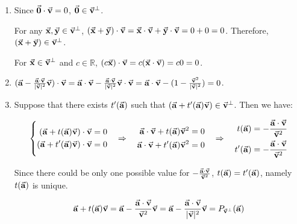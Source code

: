 \begin{exercise}{19}
\end{exercise}

\begin{exercise}{24}
  \def \Set {\Vect{v}^{\bot}}
  \begin{enumerate}
    \item Since $\vec{\mathbf{0}} \cdot \vec{\mathbf{v}} = 0$, $\Vect{0} \in \Set$.
    
          For any $\Vect{x}, \Vect{y} \in \Set$, $(\vec{\mathbf{x}} + \vec{\mathbf{y}}) \cdot \vec{\mathbf{v}} = \vec{\mathbf{x}} \cdot \vec{\mathbf{v}} + \vec{\mathbf{y}} \cdot \vec{\mathbf{v}} = 0 + 0 = 0$. Therefore, $(\Vect{x} + \Vect{y}) \in \Set$.
          
          For $\Vect{x} \in \Set$ and $c \in \mathbb{R}$, $(c\vec{\mathbf{x}}) \cdot \vec{\mathbf{v}} = c(\vec{\mathbf{x}} \cdot \vec{\mathbf{v}}) = c0 = 0$. \rQED
    
    \item $(\vec{\mathbf{a}} - \frac{\vec{\mathbf{a}} \cdot \vec{\mathbf{v}}}{|\vec{\mathbf{v}}|^2}\vec{\mathbf{v}}) \cdot \vec{\mathbf{v}} =
            \vec{\mathbf{a}} \cdot \vec{\mathbf{v}} - \frac{\vec{\mathbf{a}}\cdot\vec{\mathbf{v}}}{|\vec{\mathbf{v}}|^2}\vec{\mathbf{v}} \cdot \vec{\mathbf{v}} =
            \vec{\mathbf{a}} \cdot \vec{\mathbf{v}} - (1 - \frac{\vec{\mathbf{v}}^2}{|\vec{\mathbf{v}}|^2}) = 0$. \rQED
            
    \item Suppose that there exists $t'(\vec{\mathbf{a}})$ such that $(\Vect{a} + t'(\Vect{a})\Vect{v}) \in \Set$. Then we have:
    
         $$\left\{
         \begin{aligned}
            (\vec{\mathbf{a}} + t(\vec{\mathbf{a}})\vec{\mathbf{v}}) \cdot \vec{\mathbf{v}} = 0 \\
            (\vec{\mathbf{a}} + t'(\vec{\mathbf{a}})\vec{\mathbf{v}}) \cdot \vec{\mathbf{v}} = 0
         \end{aligned} \quad \Rightarrow \quad
         \begin{aligned}
            \vec{\mathbf{a}} \cdot \vec{\mathbf{v}} + t(\vec{\mathbf{a}})\vec{\mathbf{v}}^2 = 0 \\
            \vec{\mathbf{a}} \cdot \vec{\mathbf{v}} + t'(\vec{\mathbf{a}})\vec{\mathbf{v}}^2 = 0
         \end{aligned} \quad \Rightarrow \quad 
         \begin{aligned}
            t(\vec{\mathbf{a}}) = -\frac{\vec{\mathbf{a}} \cdot \vec{\mathbf{v}}}{\vec{\mathbf{v}}^2} \\
            t'(\vec{\mathbf{a}}) = -\frac{\vec{\mathbf{a}} \cdot \vec{\mathbf{v}}}{\vec{\mathbf{v}}^2}
         \end{aligned}
         \right.$$
         
         Since there could be only one possible value for $-\frac{\vec{\mathbf{a}} \cdot \vec{\mathbf{v}}}{\vec{\mathbf{v}}^2}$, $t(\vec{\mathbf{a}}) = t'(\vec{\mathbf{a}})$, namely $t(\vec{\mathbf{a}})$ is unique.
         
        $$\Vect{a} + t(\Vect{a})\Vect{v} = \Vect{a} -\frac{\Vect{a} \cdot \Vect{v}}{\Vect{v}^2}\Vect{v} = \Vect{a} - \frac{\Vect{a} \cdot \Vect{v}}{|\Vect{v}|^2}\Vect{v} = P_{\Set}(\Vect{a})$$
        
        \rQED
  \end{enumerate}
\end{exercise}

\begin{exercise}{26}
\end{exercise}
